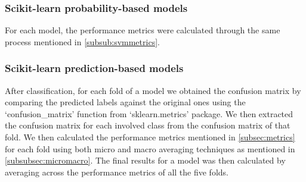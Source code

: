         \subsubsection{Scikit-learn probability-based models}
        For each model, the performance metrics were calculated through the same process mentioned in \ref{subsub:svmmetrics}.

        \subsubsection{Scikit-learn prediction-based models}
        After classification, for each fold of a model we obtained the confusion matrix by comparing the predicted labels 
        against the original ones using the `confusion\_matrix' function from `sklearn.metrics' package. 
        We then extracted the confusion matrix for each involved class from the confusion matrix of that fold.
        We then calculated the performance metrics mentioned in \ref{subsec:metrics} for each fold using both micro and macro 
        averaging techniques as mentioned in \ref{subsubsec:micromacro}. The final results for a model was then calculated by 
        averaging across the performance metrics of all the five folds.